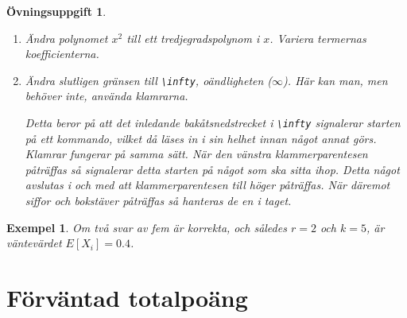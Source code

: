 \documentclass[12pt,a4wide]{article}
\newtheorem{exempel}{Exempel} %
\theoremstyle{uppgiftsstil}
\newcommand{\ovningstext}{Övningsuppgift}
\newtheorem{ovning}{\ovningstext}
\newenvironment{uppgift}{\begin{framed}\begin{ovning}}%
                        {\end{ovning}\end{framed}}
\theoremstyle{avklaradstil}
\begin{document}
\begin{uppgift}
\begin{enumerate}
      Tecknet \verb|^|, ibland kallat ''upphöjttecken'', används för
      såväl exponenter som övre gränser på summor och integraler.  
    \item Ändra polynomet $x^2$ till ett tredjegradspolynom i
      $x$. Variera termernas koefficienterna.  
    \item Ändra slutligen gränsen till \verb|\infty|, oändligheten
      ($\infty$). Här kan man, men behöver inte, använda
      klamrarna. 

      Detta beror på att det inledande bakåtsnedstrecket i
      \verb|\infty| signalerar starten på ett kommando, vilket då
      läses in i sin helhet innan något annat görs. Klamrar fungerar
      på samma sätt. När den vänstra klammerparentesen påträffas så
      signalerar detta starten på något som ska sitta ihop. Detta
      något avslutas i och med att klammerparentesen till höger
      påträffas. När däremot siffor och bokstäver påträffas så
      hanteras de en i taget. 
  \end{enumerate}
\end{uppgift}


\begin{exempel}  
  Om två svar av fem är korrekta, och således $r=2$
  och $k=5$, är väntevärdet $E[X_i]=0.4$.
\end{exempel}

\section{Förväntad totalpoäng} \label{sect:test}
\end{document}
